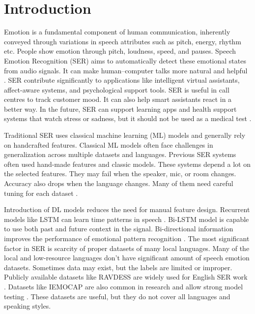 \documentclass[runningheads]{llncs}
\begin{document}
\section{Introduction}

Emotion is a fundamental component of human communication, inherently conveyed through variations in speech attributes such as pitch, energy, rhythm etc. People show emotion through pitch, loudness, speed, and pauses. Speech Emotion Recognition (SER) aims to automatically detect these emotional states from audio signals. It can make human–computer talks more natural and helpful \cite{ElAyadi2011Survey,Schuller2011Challenge}. SER contribute significantly to applications like intelligent virtual assistants, affect-aware systems, and psychological support tools. SER is useful in call centres to track customer mood. It can also help smart assistants react in a better way. In the future, SER can support learning apps and health support systems that watch stress or sadness, but it should not be used as a medical test \cite{Schuller2011Challenge,Bhattacharya2024CrossLingual}.

Traditional SER uses classical machine learning (ML) models and generally rely on handcrafted features. Classical ML models often face challenges in generalization across multiple datasets and languages. Previous SER systems often used hand-made features and classic models. These systems depend a lot on the selected features. They may fail when the speaker, mic, or room changes. Accuracy also drops when the language changes. Many of them need careful tuning for each dataset \cite{ElAyadi2011Survey}.

Introduction of DL models reduces the need for manual feature design. Recurrent models like LSTM can learn time patterns in speech  \cite{Hochreiter1997LSTM}. Bi-LSTM model is capable to use both past and future context in the signal. Bi-directional information improves the performance of emotional pattern recognition  \cite{Graves2005BiLSTM}. The most significant factor in SER is scarcity of proper datasets of many local languages. Many of the local and low-resource languages don’t have significant amount of speech emotion datasets. Sometimes data may exist, but the labels are limited or improper. Publicly available datasets like RAVDESS are widely used for English SER work  \cite{Livingstone2018RAVDESS}. Datasets like IEMOCAP are also common in research and allow strong model testing  \cite{Busso2008IEMOCAP}. These datasets are useful, but they do not cover all languages and speaking styles.
\end{document}
